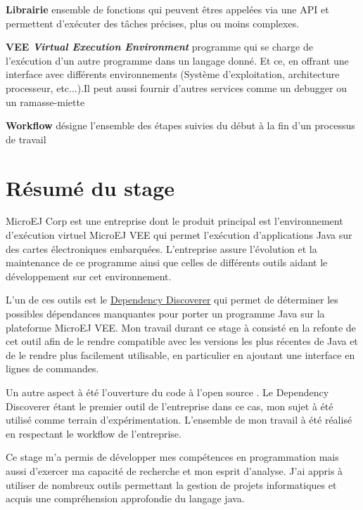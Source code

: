\documentclass[french,a4paper,12pt]{report}
\begin{document}
\bigskip

\hypertarget{Librairie}{\noindent\textbf{Librairie} ensemble de fonctions qui peuvent êtres appelées via une API et permettent d'exécuter des tâches précises, plus ou moins complexes.}

\bigskip

\hypertarget{VEE}{\noindent\textbf{VEE \emph{Virtual Execution Environment}} programme qui se charge de l’exécution d'un autre programme dans un langage donné. Et ce, en offrant une interface avec différents environnements (Système d'exploitation, architecture processeur, etc...).Il peut aussi fournir d'autres services comme un debugger ou un ramasse-miette}

\bigskip

\hypertarget{Workflow}{\noindent\textbf{Workflow} désigne l'ensemble des étapes suivies du début à la fin d'un processus de travail}

\chapter*{Résumé du stage}

MicroEJ Corp est une entreprise dont le produit principal est l'environnement d’exécution virtuel MicroEJ VEE qui permet l’exécution d'applications Java sur des cartes électroniques embarquées. L'entreprise assure l'évolution et la maintenance de ce programme ainsi que celles de différents outils aidant le développement sur cet environnement.

L'un de ces outils est le \href{https://github.com/MicroEJ/Tool-ApiDependencyDiscoverer}{Dependency Discoverer} qui permet de déterminer les possibles dépendances manquantes pour porter un programme Java sur la plateforme MicroEJ VEE. Mon travail durant ce stage à consisté en la refonte de cet outil afin de le rendre compatible avec les versions les plus récentes de Java et de le rendre plus facilement utilisable, en particulier en ajoutant une interface en lignes de commandes. 

Un autre aspect à été l'ouverture du code à l'open source . Le Dependency Discoverer étant le premier outil de l'entreprise dans ce cas, mon sujet à été utilisé comme terrain d'expérimentation. L'ensemble de mon travail à été réalisé en respectant le workflow de l'entreprise.

Ce stage m'a permis de développer mes compétences en programmation mais aussi d'exercer ma capacité de recherche et mon esprit d'analyse. J'ai appris à utiliser de nombreux outils permettant la gestion de projets informatiques et acquis une compréhension approfondie du langage java.  
\end{document}
